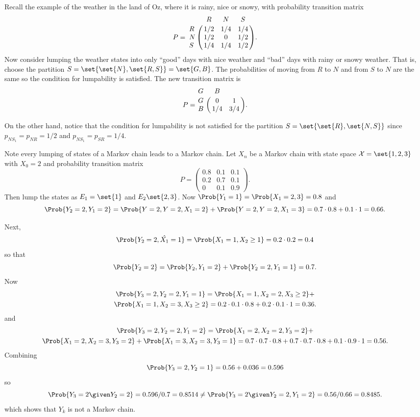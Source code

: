 \documentclass[12pt]{article}
\begin{document}
\begin{example}
    Recall the example of the weather in the land of Oz, where it is
    rainy, nice or snowy, with probability transition matrix
    \[
        P = \bordermatrix{ & R & N & S \cr
        R & 1/2 & 1/4 & 1/4 \cr
        N & 1/2 & 0 & 1/2 \cr
        S & 1/4 & 1/4 & 1/2 }.
    \] Now consider lumping the weather states into only ``good'' days
    with nice weather and ``bad'' days with rainy or snowy weather.
    That is, choose the partition \( S = \set{ \set{N}, \set{R,S}} =
    \set{G, B} \). The probabilities of moving from \( R \) to \( N \)
    and from \( S \) to \( N \) are the same so the condition for
    lumpability is satisfied.  The new transition matrix is
    \[
        P = \bordermatrix{ G & B \cr
        G & 0 & 1 \cr
        B & 1/4 & 3/4}.
    \]

    On the other hand, notice that the condition for lumpability is not
    satisfied for the partition \( S = \set{ \set{R}, \set{N, S}} \)
    since \( p_{N S_1} = p_{NR} = 1/2 \) and \( p_{N S_1} = p_{SR} = 1/4
    \).
  \end{example}

  \begin{example}
    Note every lumping of states of a Markov chain leads to a Markov
    chain. Let $X_n$ be a Markov chain with state space $\mathcal{X} =
    \set{1,2, 3}$ with $X_0 = 2$ and probability transition matrix
    \[
      P =   \begin{pmatrix}
    0.8 & 0.1 & 0.1 \\
    0.2 & 0.7 & 0.1 \\
    0   & 0.1 & 0.9
  \end{pmatrix}.
    \]
    Then lump the states as $E_1 = \set{1}$ and $E_2 \set{2,3}$.  Now
    \( \Prob{Y_1 = 1} = \Prob{X_1 = 2,3} = 0.8 \) and
    \[
    \Prob{Y_2 = 2, Y_1 = 2} = \Prob{Y = 2, Y
      =2, X_1 = 2} + \Prob{Y = 2, Y=2, X_1 = 3} 
    = 0.7 \cdot 0.8 + 0.1 \cdot 1 = 0.66.
    \]

    Next,
    \[
      \Prob{Y_2 = 2, \hat{X_1} = 1} = \Prob{X_1 = 1, X_2 \ge 1}
      = 0.2 \cdot 0.2 = 0.4
    \]
    so that
    \[
      \Prob{Y_2 = 2} = \Prob{Y_2, Y_1 = 2} + \Prob{Y_2=2, Y_1 = 1} = 0.7.
    \]
    Now
    \begin{multline*}
      \Prob{Y_3 = 2, Y_2=2, Y_1=1} = \Prob{X_1=1, X_2=2, X_3 \ge 2} +\\
       \Prob{X_1=1, X_2=3, X_3 \ge 2} = 0.2 \cdot 0.1 \cdot 0.8 + 0.2
       \cdot 0.1 \cdot 1 = 0.36.
     \end{multline*}
     and
    \begin{multline*}
      \Prob{Y_3 = 2, Y_2=2, Y_1=2} = \Prob{X_1=2, X_2=2, Y_3 =2} +\\
       \Prob{X_1=2, X_2=3, Y_3 =2} + \Prob{X_1=3, X_2=3, Y_3 =1} = 0.7 \cdot 0.7 \cdot 0.8 + 0.7
       \cdot 0.7 \cdot 0.8 + 0.1 \cdot 0.9 \cdot 1 = 0.56.
     \end{multline*}
     Combining
     \[
       \Prob{Y_3 = 2, Y_2 = 1} = 0.56 + 0.036 = 0.596
     \]
     so
     \[
       \Prob{Y_3=2 \given Y_2 = 2} = 0.596/0.7 = 0.8514 \ne \Prob{Y_3
         = 2 \given Y_2 = 2, Y_1=2} = 0.56/0.66 = 0.8485.
     \]
     which shows that $Y_k$ is not a Markov chain.
  \end{example}
\end{document}
